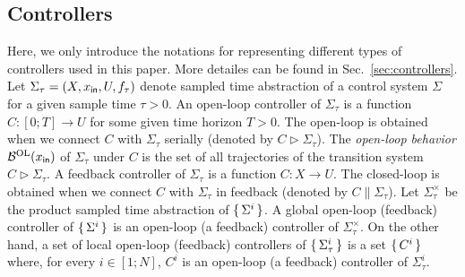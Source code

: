 \subsection{Controllers} Here, we only introduce the notations for representing different types of controllers used in this paper. More detailes can be found in Sec.~\ref{sec:controllers}. Let $\Sigma_\tau=(X,x_{\mathsf{in}},U,f_\tau)$ denote sampled time abstraction of a control system $\Sigma$ for a given sample time $\tau>0$. An open-loop controller of $\Sigma_\tau$ is a function $C\colon [0;T]\to U$ for some given time horizon $T>0$. The open-loop is obtained when we connect $C$ with $\Sigma_\tau$ serially (denoted by $C \triangleright \Sigma_\tau$). The \emph{open-loop behavior} $\mathcal{B}^{\mathrm{OL}}(x_{\mathsf{in}})$ of $\Sigma_\tau$ under $C$ is the set of all trajectories of the transition system $C \triangleright \Sigma_\tau$. A feedback controller of $\Sigma_\tau$ is a function $C\colon X\to U$. The closed-loop is obtained when we connect $C$ with $\Sigma_\tau$ in feedback (denoted by $C\parallel\Sigma_\tau$). %
Let $\Sigma^\times_\tau$ be the product sampled time abstraction of $\set{\Sigma^i} $.
A global open-loop (feedback) controller of $\set{\Sigma^i} $ is an open-loop (a feedback) controller of $\Sigma_\tau^\times$.
On the other hand, a set of local open-loop (feedback) controllers of $\set{\Sigma^i_\tau} $ is a set $\set{C^i} $ where, for every $i\in [1;N]$, $C^i$ is an open-loop (a feedback) controller of $\Sigma^i_\tau$.

%
%
